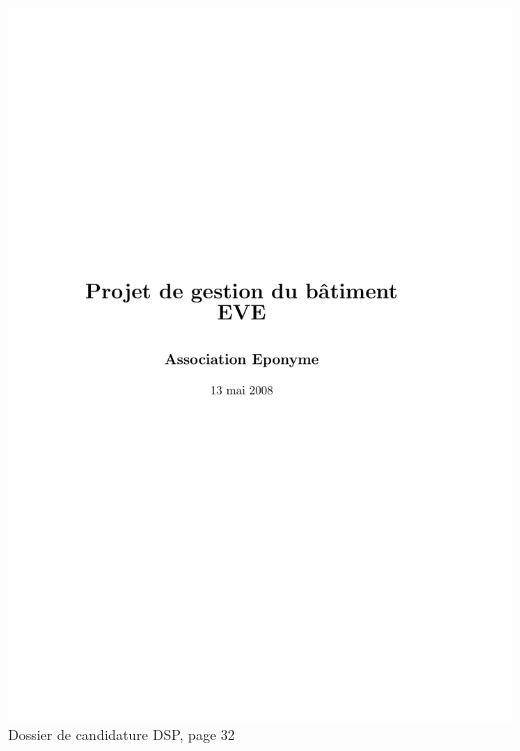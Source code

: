 \includegraphics[scale=0.85,trim=20mm 20mm 20mm 20mm,clip,page=32]{annexes/candidature_dsp.pdf} \\
Dossier de candidature DSP, page 32
\newpage
